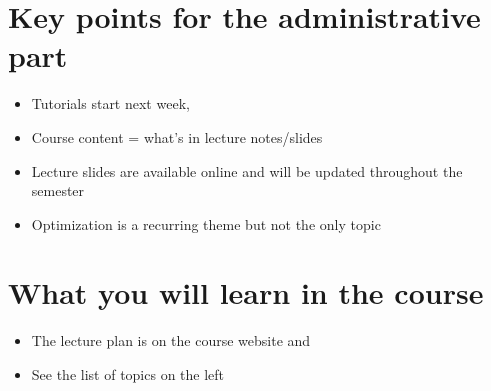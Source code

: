 \documentclass[letterpaper,10pt,english]{jupyterBook}
\begin{document}
\section{Key points for the administrative part}
\label{\detokenize{01.introduction:key-points-for-the-administrative-part}}\begin{itemize}
\item {} 
\sphinxAtStartPar
Tutorials start next week, 

\item {} 
\sphinxAtStartPar
Course content = what’s in lecture notes/slides

\item {} 
\sphinxAtStartPar
Lecture slides are available online and will be updated throughout the semester

\item {} 
\sphinxAtStartPar
Optimization is a recurring theme but not the only topic

\end{itemize}


\section{What you will learn in the course}
\label{\detokenize{01.introduction:what-you-will-learn-in-the-course}}\begin{itemize}
\item {} 
\sphinxAtStartPar
The lecture plan is on the course website  and 

\item {} 
\sphinxAtStartPar
See the list of topics on the left

\end{itemize}
\end{document}
